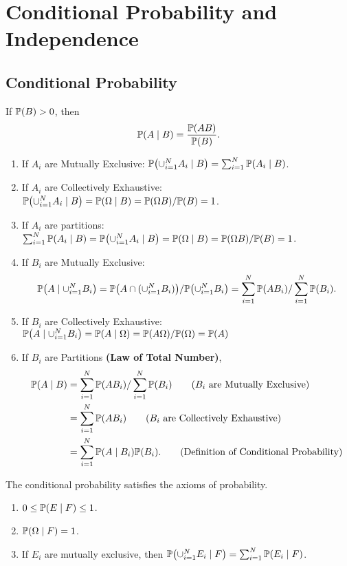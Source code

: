 \chapter{Conditional Probability and Independence}

\section{Conditional Probability}
\begin{theorem}
    If $\P{B}>0$, then
    \[\condP{A}{B} = \frac{\P{AB}}{\P{B}}.\]
\end{theorem}
\begin{enumerate}
    \item If $A_i$ are Mutually Exclusive: $\condP{\cup_{i=1}^{N}A_i}{B} = \sum_{i=1}^{N}\condP{A_i}{B}$.
    \item If $A_i$ are Collectively Exhaustive: $\condP{\cup_{i=1}^N A_i}{B}=\condP{\Omega}{B}=\P{\Omega B}/\P{B}=1$.
    \item If $A_i$ are partitions: $\sum_{i=1}^{N}\condP{A_i}{B}=\condP{\cup_{i=1}^{N}A_i}{B}=\condP{\Omega}{B}=\P{\Omega B}/\P{B}=1$.
    \item If $B_i$ are Mutually Exclusive: \[\condP{A}{\cup_{i=1}^{N}B_i} = \P{A\cap(\cup_{i=1}^N B_i)}/\P{\cup_{i=1}^N B_i}=\sum_{i=1}^{N}\P{AB_i}/\sum_{i=1}^N\P{B_i}.\]
    \item If $B_i$ are Collectively Exhaustive: $\condP{A}{\cup_{i=1}^{N}B_i} = \condP{A}{\Omega}=\P{A\Omega}/\P{\Omega}=\P{A}$
    \item If $B_i$ are Partitions \textbf{(Law of Total Number)},
    \begin{align}
        \condP{A}{B}
        &= \sum_{i=1}^{N}\P{AB_i}/\sum_{i=1}^N\P{B_i} \tag{$B_i$ are Mutually Exclusive} \\
        &= \sum_{i=1}^{N}\P{AB_i}  \tag{$B_i$ are Collectively Exhaustive} \\
        &= \sum_{i=1}^{N}\condP{A}{B_i}\P{B_i}. \tag{Definition of Conditional Probability}
    \end{align}
\end{enumerate}

\begin{theorem}
    The conditional probability satisfies the axioms of probability.
    \begin{enumerate}
        \item $0\leq\condP{E}{F}\leq 1$.
        \item $\condP{\Omega}{F}=1$.
        \item If $E_i$ are mutually exclusive, then $\condP{\cup_{i=1}^{N}E_i}{F}=\sum_{i=1}^{N}\condP{E_i}{F}$.
    \end{enumerate}
\end{theorem}

